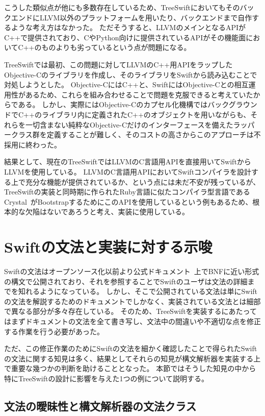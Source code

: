 こうした類似点が他にも多数存在しているため、TreeSwiftにおいてもそのバックエンドにLLVM以外のプラットフォームを用いたり、バックエンドまで自作するような考え方はなかった。
ただそうすると、LLVMのメインとなるAPIがC++で提供されており、CやPython向けに提供されているAPIがその機能面においてC++のものよりも劣っているという点が問題になる。

TreeSwiftでは最初、この問題に対してLLVMのC++用APIをラップしたObjective-Cのライブラリを作成し、そのライブラリをSwiftから読み込むことで対処しようとした。
Objective-CにはC++と、SwiftにはObjective-Cとの相互運用性があるため、これらを組み合わせることで問題を克服できると考えていたからである。
しかし、実際にはObjective-Cのカプセル化機構ではバックグラウンドでC++のライブラリ内に定義されたC++のオブジェクトを用いながらも、それらを一切含まない純粋なObjective-Cだけのインターフェースを備えたラッパークラス群を定義することが難しく、そのコストの高さからこのアプローチは不採用に終わった。

結果として、現在のTreeSwiftではLLVMのC言語用APIを直接用いてSwiftからLLVMを使用している。
LLVMのC言語用APIにおいてSwiftコンパイラを設計する上で充分な機能が提供されているか、という点には未だ不安が残っているが、TreeSwiftの実装と同時期に作られたRuby言語に似たコンパイラ型言語であるCrystal~\cite{crystal}がBootstrapするためにこのAPIを使用しているという例もあるため、根本的な欠陥はないであろうと考え、実装に使用している。


\section{Swiftの文法と実装に対する示唆}

Swiftの文法はオープンソース化以前より公式ドキュメント~\cite{swift-grammar}上でBNFに近い形式の構文で公開されており、それを参照することでSwiftのユーザは文法の詳細までを知れるようになっている。
しかし、そこで公開されている文法は単にSwiftの文法を解説するためのドキュメントでしかなく、実装されている文法とは細部で異なる部分が多々存在している。
そのため、TreeSwiftを実装するにあたってはまずドキュメントの文法を全て書き写し、文法中の間違いや不適切な点を修正する作業を行う必要があった。

ただ、この修正作業のためにSwiftの文法を細かく確認したことで得られたSwiftの文法に関する知見は多く、結果としてそれらの知見が構文解析器を実装する上で重要な幾つかの判断を助けることとなった。
本節ではそうした知見の中から特にTreeSwiftの設計に影響を与えた1つの例について説明する。

\subsection{文法の曖昧性と構文解析器の文法クラス}

